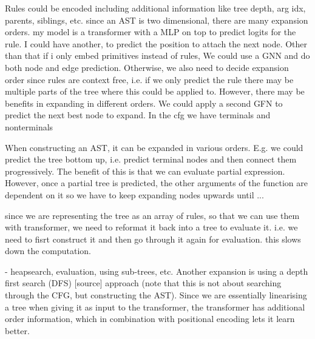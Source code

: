 Rules could be encoded including additional information like tree depth, arg idx, parents, siblings, etc. 
since an AST is two dimensional, there are many expansion orders. 
my model is a transformer with a MLP on top to predict logits for the rule. I could have another, to predict the position to attach the next node. Other than that if i only embed primitives instead of rules, 
We could use a GNN and do both node and edge prediction. 
Otherwise, we also need to decide expansion order since rules are context free, i.e. if we only predict the rule there may be multiple parts of the tree where this could be applied to. However, there may be benefits in expanding in different orders. We could apply a second GFN to predict the next best node to expand.
In the cfg we have terminals and nonterminals

When constructing an AST, it can be expanded in various orders.
E.g. we could predict the tree bottom up, i.e. predict terminal nodes and then connect them progressively. The benefit of this is that we can evaluate partial expression. However, once a partial tree is predicted, the other arguments of the function are dependent on it so we have to keep expanding nodes upwards until ...

since we are representing the tree as an array of rules, so that we can use them with transformer, we need to reformat it back into a tree to evaluate it. i.e. we need to fisrt construct it and then go through it again for evaluation. this slows down the computation. 


- heapsearch, evaluation, using sub-trees, etc. 
Another expansion is using a depth first search (DFS) [source] approach (note that this is not about searching through the CFG, but constructing the AST). Since we are essentially linearising a tree when giving it as input to the transformer, the transformer has additional order information, which in combination with positional encoding lets it learn better. 


\subsection{}

